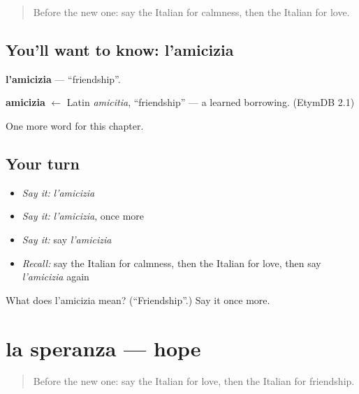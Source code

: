 \label{lesson:IT-C186-amicizia}



\begin{quote}
Before the new one: say the Italian for calmness, then the Italian for love.
\end{quote}

\subsection*{You'll want to know: l'amicizia}
\textbf{l'amicizia} — \textquotedblleft{}friendship\textquotedblright{}.

\begin{cousinweb}
\textbf{amicizia} $\leftarrow$ Latin \emph{amicitia}, \textquotedblleft{}friendship\textquotedblright{} — a learned borrowing. (EtymDB 2.1)
\end{cousinweb}

\begin{grammarlens}[title={What you've built}]
One more word for this chapter.
\end{grammarlens}

\subsection*{Your turn}
\begin{itemize}
\raggedright
  \item \emph{Say it:} \emph{l'amicizia}
  \item \emph{Say it:} \emph{l'amicizia}, once more
  \item \emph{Say it:} say \emph{l'amicizia}
  \item \emph{Recall:} say the Italian for calmness, then the Italian for love, then say \emph{l'amicizia} again
\end{itemize}

\begin{tcolorbox}[breakable,colback=teal!4,colframe=teal!35!black,title={Before you move on}]
What does l'amicizia mean? (\textquotedblleft{}Friendship\textquotedblright{}.) Say it once more.
\end{tcolorbox}
\section[la speranza]{la speranza — hope}

\label{lesson:IT-C186-speranza}



\begin{quote}
Before the new one: say the Italian for love, then the Italian for friendship.
\end{quote}

